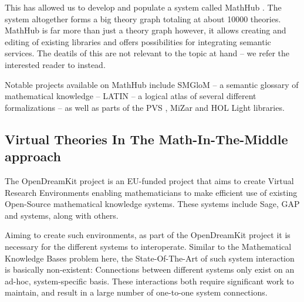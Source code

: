 This has allowed us to develop and populate a system called MathHub \cite{MathHub:on}. 
The system altogether forms a big theory graph totaling at about 10000 theories. 
MathHub is far more than just a theory graph however, it allows creating and editing of existing libraries and offers possibilities for integrating semantic services.
The deatils of this are not relevant to the topic at hand -- we refer the interested reader to \cite{Iancu:phd} instead.

Notable projects available on MathHub include SMGloM \cite{SMGloM:on} -- a semantic glossary of mathematical knowledge -- LATIN \cite{LATIN:online} -- a logical atlas of several different formalizations  -- as well as parts of the PVS \cite{PVSlibraries:on}, MiZar \cite{mizar:online} and HOL Light \cite{KalRab:hollight:14} libraries.

\subsection{Virtual Theories In The Math-In-The-Middle approach}\label{sec:mmtmitm:odk}

The OpenDreamKit \cite{OpenDreamKit:on} project is an EU-funded project that aims to create Virtual Research Environments enabling mathematicians to make efficient use of existing Open-Source mathematical knowledge systems. 
These systems include Sage, GAP and \lmfdb systems, along with others. 

Aiming to create such environments, as part of the OpenDreamKit project it is necessary for the different systems to interoperate. 
Similar to the Mathematical Knowledge Bases problem here, the State-Of-The-Art of such system interaction is basically non-existent: 
Connections between different systems only exist on an ad-hoc, system-specific basis. 
These interactions both require significant work to maintain, and result in a large number of one-to-one system connections. 

